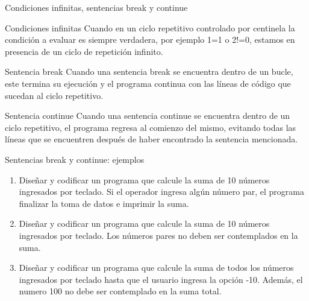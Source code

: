 \documentclass[xcolor=pdftex,table,11pt]{beamer}
\begin{document}
\begin{frame}{Condiciones infinitas, sentencias break y continue}

\begin{block}{Condiciones infinitas}
Cuando en un ciclo repetitivo controlado por centinela la condición a evaluar es siempre verdadera, por ejemplo 1=1 o  2!=0, estamos en presencia de un ciclo de repetición infinito.
\end{block}

\begin{block}{Sentencia break}
Cuando una sentencia break se encuentra dentro de un bucle, este termina su ejecución y el programa continua con las líneas de código que sucedan al ciclo repetitivo.
\end{block}

\begin{block}{Sentencia continue}
Cuando una sentencia continue se encuentra dentro de un ciclo repetitivo, el programa regresa al comienzo del mismo, evitando todas las líneas que se encuentren después de haber encontrado la sentencia mencionada. 
\end{block}

\end{frame}


\begin{frame}{Sentencias break y continue: ejemplos}
 \begin{enumerate}
   
     \item Diseñar y codificar un programa que calcule la suma de 10 números ingresados por teclado. Si el operador ingresa algún número par, el programa finalizar la toma de datos e imprimir la suma. \\
\href{https://github.com/danis963/informaticaI_IUA/blob/main/c/src/5-break_cont_1.c}{}

\item Diseñar y codificar un programa que calcule la suma de 10 números ingresados por teclado. Los números pares no deben ser contemplados en la suma.\\
\href{https://github.com/danis963/informaticaI_IUA/blob/main/c/src/5-break_cont_2.c}{}

\item Diseñar y codificar un programa que calcule la suma de todos los números ingresados por teclado hasta que el usuario ingresa la opción -10. Además, el numero 100 no debe ser contemplado en la suma total.
\href{https://github.com/danis963/informaticaI_IUA/blob/main/c/src/5-break_cont_3.c}{}

   \end{enumerate}
\end{frame}
\end{document}
